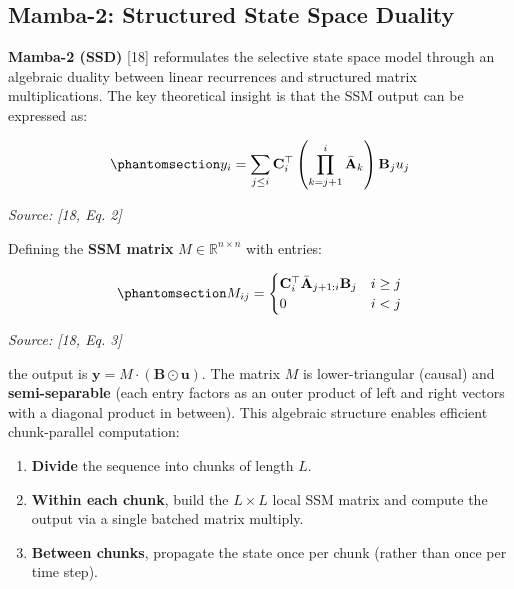 \subsection{Mamba-2: Structured State Space Duality}\label{sec:mamba-2-structured-state-space-duality}

\textbf{Mamba-2 (SSD)} {[}18{]} reformulates the selective state space model through an algebraic duality between linear recurrences and structured matrix multiplications. The key theoretical insight is that the SSM output can be expressed as:

\begin{equation}\protect\phantomsection\label{eq:mamba-ssd-output}{y_i = \sum_{j \leq i} \mathbf{C}_i^\top \left(\prod_{k=j+1}^{i} \bar{\mathbf{A}}_k\right) \mathbf{B}_j u_j
}\end{equation} \par{\small\textit{Source: [18, Eq. 2]}}

Defining the \textbf{SSM matrix} \(M \in \mathbb{R}^{n \times n}\) with entries:

\begin{equation}\protect\phantomsection\label{eq:mamba-ssd-matrix}{M_{ij} = \begin{cases} \mathbf{C}_i^\top \bar{\mathbf{A}}_{j+1:i} \mathbf{B}_j & i \geq j \\ 0 & i < j \end{cases}
}\end{equation} \par{\small\textit{Source: [18, Eq. 3]}}

the output is \(\mathbf{y} = M \cdot (\mathbf{B} \odot \mathbf{u})\). The matrix \(M\) is lower-triangular (causal) and \textbf{semi-separable} (each entry factors as an outer product of left and right vectors with a diagonal product in between). This algebraic structure enables efficient chunk-parallel computation:

\begin{enumerate}
\def\labelenumi{\arabic{enumi}.}
\tightlist
\item
  \textbf{Divide} the sequence into chunks of length \(L\).
\item
  \textbf{Within each chunk}, build the \(L \times L\) local SSM matrix and compute the output via a single batched matrix multiply.
\item
  \textbf{Between chunks}, propagate the state once per chunk (rather than once per time step).
\end{enumerate}

